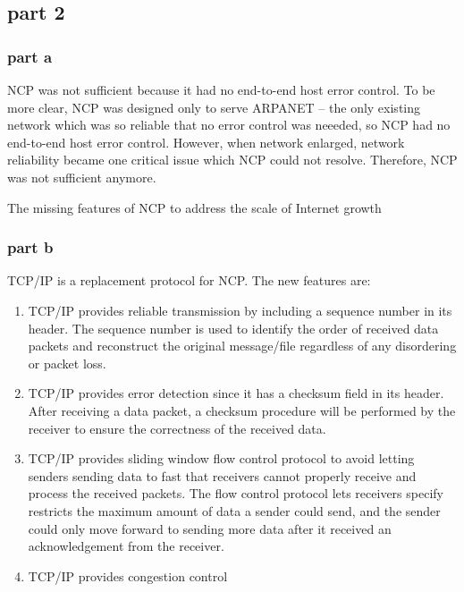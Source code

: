 \subsection{part 2}
\subsubsection{part a} NCP was not sufficient because it had no end-to-end host error control. To be more clear, NCP was designed only to serve ARPANET -- the only existing network which was so reliable that no error control was neeeded, so NCP had no end-to-end host error control. However, when network enlarged, network reliability became one critical issue which NCP could not resolve. Therefore, NCP was not sufficient anymore.

The missing features of NCP to address the scale of Internet growth
\subsubsection{part b} TCP/IP is a replacement protocol for NCP. The new features are:

\begin{enumerate}
\item TCP/IP provides reliable transmission by including a sequence number in its header. The sequence number is used to identify the order of received data packets and reconstruct the original message/file regardless of any disordering or packet loss.
\item TCP/IP provides error detection since it has a checksum field in its header. After receiving a data packet, a checksum procedure will be performed by the receiver to ensure the correctness of the received data.
\item TCP/IP provides sliding window flow control protocol to avoid letting senders sending data to fast that receivers cannot properly receive and process the received packets. The flow control protocol lets receivers specify restricts the maximum amount of data a sender could send, and the sender could only move forward to sending more data after it received an acknowledgement from the receiver.
\item TCP/IP provides congestion control
\end{enumerate}












